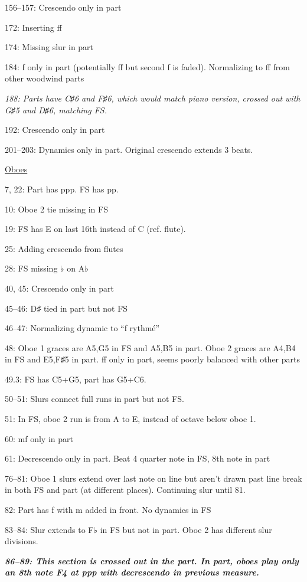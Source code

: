 \documentclass[twoside]{article}
\begin{document}
\begin{hangparas}{15pt}{1}
\begin{multicols}{2}
156--157: Crescendo only in part

172: Inserting ff

174: Missing slur in part

184: f only in part (potentially ff but second f is faded). Normalizing to ff from other woodwind parts

\textit{188: Parts have C♯6 and F♯6, which would match piano version, crossed out with G♯5 and D♯6, matching FS.}

192: Crescendo only in part

201--203: Dynamics only in part. Original crescendo extends 3 beats.

\underline{Oboes}

7, 22: Part has ppp. FS has pp.

10: Oboe 2 tie missing in FS

19: FS has E on last 16th instead of C (ref. flute).

25: Adding crescendo from flutes

28: FS missing ♭ on A♭

40, 45: Crescendo only in part

45--46: D♯ tied in part but not FS

46--47: Normalizing dynamic to ``f rythmé''

48: Oboe 1 graces are A5,G5 in FS and A5,B5 in part. Oboe 2 graces are A4,B4 in FS and E5,F♯5 in part. ff only in part, seems poorly balanced with other parts

49.3: FS has C5+G5, part has G5+C6.

50--51: Slurs connect full runs in part but not FS.

51: In FS, oboe 2 run is from A to E, instead of octave below oboe 1.

60: mf only in part

61: Decrescendo only in part. Beat 4 quarter note in FS, 8th note in part

76--81: Oboe 1 slurs extend over last note on line but aren't drawn past line break in both FS and part (at different places). Continuing slur until 81.

82: Part has f with m added in front. No dynamics in FS

83--84: Slur extends to F♭ in FS but not in part. Oboe 2 has different slur divisions.

\textbf{\textit{86--89: This section is crossed out in the part. In part, oboes play only an 8th note F4 at ppp with decrescendo in previous measure.}}


\end{multicols}
\end{hangparas}
\end{document}
